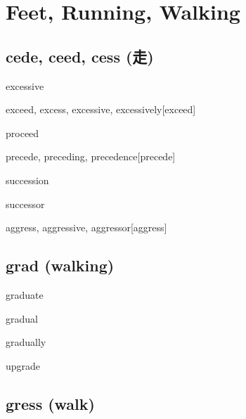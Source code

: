 \chapter{Feet, Running, Walking}

\section{cede, ceed, cess (走)}

\begin{RefWord}{excessive}
\end{RefWord}

\begin{RefWord}{exceed, excess, excessive, excessively}[exceed]
\end{RefWord}

\begin{RefWord}{proceed}
\end{RefWord}

\begin{RefWord}{precede, preceding, precedence}[precede]
\end{RefWord}

\begin{RefWord}{succession}
\end{RefWord}

\begin{RefWord}{successor}
\end{RefWord}

\begin{RefWord}{aggress, aggressive, aggressor}[aggress]
\end{RefWord}

\section{grad (walking)}

\begin{RefWord}{graduate}
\end{RefWord}

\begin{RefWord}{gradual}
\end{RefWord}

\begin{RefWord}{gradually}
\end{RefWord}

\begin{RefWord}{upgrade}
\end{RefWord}

\section{gress (walk)}

